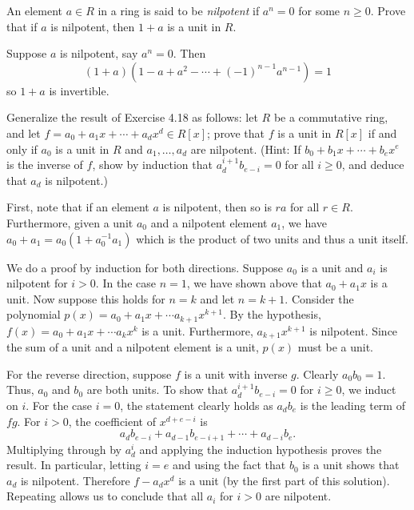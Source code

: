 \documentclass[../../master.tex]{subfiles}
\begin{document}
    \begin{problem}
        An element $a \in R$ in a ring is said to be \textit{nilpotent} if
        $a^{n} = 0$ for some $n \geq 0$. Prove that if $a$ is nilpotent, then $1
        + a$ is a unit in $R$.
    \end{problem}

    \begin{solution}
        Suppose $a$ is nilpotent, say $a^{n} = 0$. Then 
        \[
         (1 + a)(1 - a + a^2 - \cdots + (-1)^{n-1}a^{n-1}) = 1
        \] 
        so $1 + a$ is invertible.
    \end{solution}

    \begin{problem}
        Generalize the result of Exercise 4.18 as follows: let $R$ be a
        commutative ring, and let $f = a_0 + a_1x + \cdots + a_dx^d \in R[x]$;
        prove that $f$ is a unit in $R[x]$ if and only if $a_0$ is a unit in
        $R$ and $a_1, \ldots, a_d$ are nilpotent. (Hint: If $b_0 + b_1x + \cdots
        + b_ex^e$ is the inverse of $f$, show by induction that
        $a_{d}^{i+1}b_{e-i} = 0$ for all $i \geq 0$, and deduce that $a_d$ is
        nilpotent.)
    \end{problem}

    \begin{solution}
        First, note that if an element $a$ is nilpotent, then so is $ra$ for all
        $r \in R$. Furthermore, given a unit $a_0$ and a nilpotent element
        $a_1$, we have $a_0 + a_1 = a_0 (1 + a_0^{-1}a_1)$ which is the product
        of two units and thus a unit itself.

        We do a proof by induction for both directions. Suppose $a_0$ is a unit
        and $a_i$ is nilpotent for $i > 0$. In the case $n = 1$, we have shown
        above that $a_0 + a_1x$ is a unit. Now suppose this holds for $n = k$
        and let $n = k + 1$. Consider the polynomial $p(x) = a_0 + a_1x + \cdots
        a_{k+1}x^{k+1}$. By the hypothesis, $f(x) = a_0 + a_1x + \cdots
        a_kx^{k}$ is a unit. Furthermore, $a_{k+1}x^{k+1}$ is nilpotent. Since
        the sum of a unit and a nilpotent element is a unit, $p(x)$ must be a
        unit.

        For the reverse direction, suppose $f$ is a unit with inverse $g$.
        Clearly $a_0 b_0 = 1$. Thus, $a_0$ and $b_0$ are both units. To show
        that $a_d^{i + 1}b_{e-i} = 0$ for $i \geq 0$, we induct on $i$. For the
        case $i = 0$, the statement clearly holds as $a_d b_e$ is the leading
        term of $fg$. For $i > 0$, the coefficient of $x^{d + e - i}$ is
        \[
            a_{d}b_{e - i} + a_{d - 1}b_{e - i + 1} + \cdots + a_{d - i}b_{e}.
        \] 
        Multiplying through by $a_{d}^{i}$ and applying the induction hypothesis
        proves the result. In particular, letting $i = e$ and using the fact
        that $b_0$ is a unit shows that $a_d$ is nilpotent. Therefore $f -
        a_dx^{d}$ is a unit (by the first part of this solution). Repeating
        allows us to conclude that all $a_i$ for $i > 0$ are nilpotent.
    \end{solution}
\end{document}
